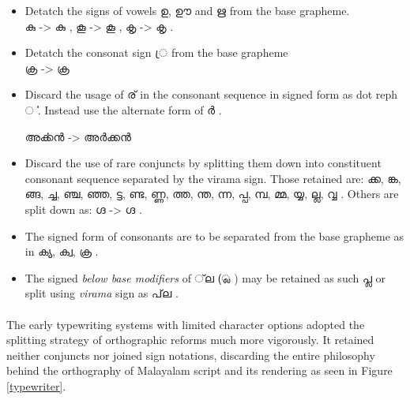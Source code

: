 \documentclass[10pt]{article}
\begin{document}
\begin{itemize}
\item
Detatch the signs of vowels {\manjari ഉ, ഊ and ഋ } from the base grapheme.\\
{\manjari കു } -> {\raghu കു } ,
{\manjari കൂ } -> {\raghu കൂ } ,
{\manjari കൃ } -> {\raghu കൃ } .

\item 
Detatch the consonat sign {\manjari  ്ര } from the base grapheme \\
{\manjari ക്ര  } -> {\raghu ക്ര  } 

\item
Discard the usage of {\manjari ര് } in the consonant sequence in signed form as dot reph {\manjari ൎ }. Instead use the alternate form of {\manjari ർ }.

 {\manjari അൎക്കൻ } -> {\manjari അർക്കൻ }

\item
Discard the use of rare conjuncts by splitting them down into constituent consonant sequence separated by the virama sign. Those retained are: {\manjari ക്ക, ങ്ക, ങ്ങ, ച്ച, ഞ്ച, ഞ്ഞ, ട്ട, ണ്ട, ണ്ണ, ത്ത, ന്ത, ന്ന, പ്പ, മ്പ, മ്മ, യ്യ, ല്ല, വ്വ }. Others are split down as: {\manjari ഗ്ദ } -> {\raghu ഗ്ദ }. 

\item
The signed form of consonants are to be separated from the base grapheme as in {\raghu ക്യ, ക്വ, ക്ര }.

\item
The signed \textit{below base modifiers} of {\manjari  ്‌ല  (്ല )  } may be retained as such {\manjari പ്ല } or split using \textit{virama} sign as {\manjari  പ്‌ല }.

\end{itemize}

\paragraph{}
The early typewriting systems with limited character options adopted the splitting strategy of orthographic reforms much more vigorously. It retained neither conjuncts nor joined sign notations, discarding the entire philosophy behind the orthography of Malayalam script and its rendering as seen in Figure \ref{typewriter}.
\end{document}
